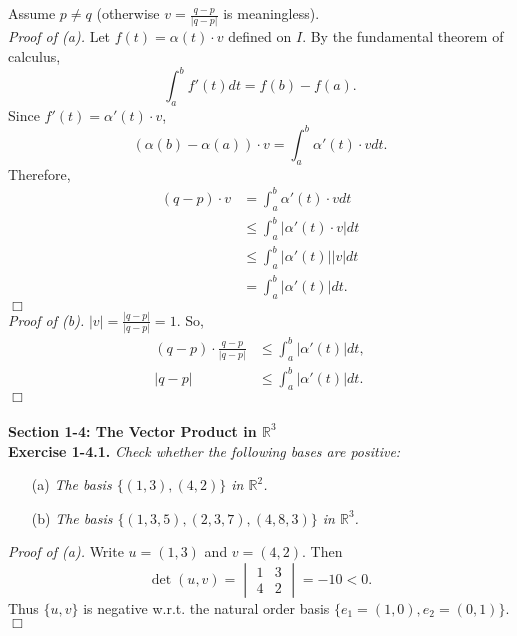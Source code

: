 \documentclass{article}
\begin{document}
Assume $p \neq q$ (otherwise $v = \frac{q-p}{|q-p|}$ is meaningless). \\

\emph{Proof of (a).}
Let $f(t) = \alpha(t) \cdot v$ defined on $I$.
By the fundamental theorem of calculus,
$$\int_{a}^{b} f'(t) dt = f(b) - f(a).$$
Since $f'(t) = \alpha'(t) \cdot v$,
$$(\alpha(b) - \alpha(a)) \cdot v = \int_{a}^{b} \alpha'(t) \cdot v dt.$$
Therefore,
\begin{align*}
(q - p) \cdot v
&= \int_{a}^{b} \alpha'(t) \cdot v dt \\
&\leq \int_{a}^{b} |\alpha'(t) \cdot v| dt \\
&\leq \int_{a}^{b} |\alpha'(t)||v| dt \\
&= \int_{a}^{b} |\alpha'(t)| dt.
\end{align*}
$\Box$ \\

\emph{Proof of (b).}
$|v| = \frac{|q-p|}{|q-p|} = 1$.
So,
\begin{align*}
(q-p) \cdot \frac{q-p}{|q-p|}
&\leq \int_{a}^{b} |\alpha'(t)| dt, \\
|q-p|
&\leq \int_{a}^{b} |\alpha'(t)| dt.
\end{align*}
$\Box$ \\\\






\textbf{\large Section 1-4: The Vector Product in $\mathbb{R}^{3}$} \\



\textbf{Exercise 1-4.1.}
\emph{Check whether the following bases are positive:}
\begin{enumerate}
  \item[(a)]
  \emph{The basis $\{(1,3), (4,2)\}$ in $\mathbb{R}^2$.}
  \item[(b)]
  \emph{The basis $\{(1,3,5), (2,3,7), (4,8,3)\}$ in $\mathbb{R}^3$.} \\
\end{enumerate}

\emph{Proof of (a).}
Write $u = (1,3)$ and $v = (4,2)$.
Then
$$\det(u,v)
= \begin{vmatrix}
  1 & 3 \\
  4 & 2
  \end{vmatrix}
= -10 < 0.$$
Thus $\{u,v\}$ is negative w.r.t. the natural order basis $\{ e_1 = (1,0), e_2 = (0,1) \}$.
$\Box$ \\
\end{document}
